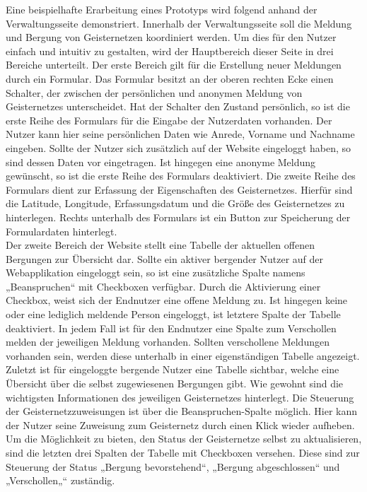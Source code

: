 \documentclass[11pt]{article}
\begin{document}
    \newpage
    Eine beispielhafte Erarbeitung eines Prototyps wird folgend anhand der Verwaltungsseite demonstriert.
    Innerhalb der Verwaltungsseite soll die Meldung und Bergung von Geisternetzen koordiniert werden.
    Um dies für den Nutzer einfach und intuitiv zu gestalten, wird der Hauptbereich dieser Seite in drei Bereiche unterteilt. Der erste Bereich gilt für
    die Erstellung neuer Meldungen durch ein Formular. Das Formular besitzt an der oberen rechten Ecke einen Schalter, der zwischen der persönlichen
    und anonymen Meldung von Geisternetzes unterscheidet. Hat der Schalter den Zustand persönlich,
    so ist die erste Reihe des Formulars für die Eingabe der Nutzerdaten vorhanden. Der Nutzer kann 
    hier seine persönlichen Daten wie Anrede, Vorname und Nachname eingeben. Sollte der Nutzer sich zusätzlich auf der 
    Website eingeloggt haben, so sind dessen Daten vor eingetragen. Ist hingegen eine anonyme Meldung gewünscht, so ist die erste Reihe des Formulars
    deaktiviert. Die zweite Reihe des Formulars dient zur Erfassung der Eigenschaften des Geisternetzes. Hierfür sind die Latitude, Longitude, Erfassungsdatum
    und die Größe des Geisternetzes zu hinterlegen. Rechts unterhalb des Formulars ist ein Button zur Speicherung der Formulardaten hinterlegt.
    \\
    Der zweite Bereich der Website stellt eine Tabelle der aktuellen offenen Bergungen zur Übersicht dar. 
    Sollte ein aktiver bergender Nutzer auf der Webapplikation 
    eingeloggt sein, so ist eine zusätzliche Spalte namens „Beanspruchen“ mit Checkboxen verfügbar. Durch die Aktivierung einer Checkbox, weist sich der 
    Endnutzer eine offene Meldung zu. Ist hingegen keine oder eine lediglich meldende Person eingeloggt, ist letztere Spalte der Tabelle deaktiviert. In jedem Fall ist für den Endnutzer 
    eine Spalte zum Verschollen melden der jeweiligen Meldung vorhanden.
    Sollten verschollene Meldungen vorhanden sein, werden diese unterhalb in einer eigenständigen Tabelle angezeigt.
    \\
    Zuletzt ist für eingeloggte bergende Nutzer eine Tabelle sichtbar, welche eine Übersicht über die 
    selbst zugewiesenen Bergungen gibt. Wie gewohnt sind die wichtigsten Informationen des jeweiligen Geisternetzes hinterlegt. Die Steuerung der Geisternetzzuweisungen ist über die Beanspruchen-Spalte möglich. Hier kann der Nutzer seine Zuweisung zum 
    Geisternetz durch einen Klick wieder aufheben. Um die Möglichkeit zu bieten, den Status der Geisternetze selbst zu aktualisieren, sind die letzten drei Spalten der Tabelle mit Checkboxen versehen. Diese sind zur Steuerung der Status „Bergung bevorstehend“,
    „Bergung abgeschlossen“ und „Verschollen„“ zuständig.
\end{document}
